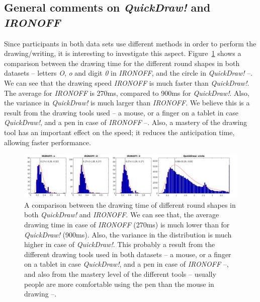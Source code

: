 
\subsection{General comments on \textit{QuickDraw!} and \textit{IRONOFF}}
\par Since participants in both data sets use different methods in order to perform the drawing/writing, it is interesting to investigate this aspect. Figure~\ref{fig:ironoff_quickdraw_connection} shows a comparison between the drawing time for the different round shapes in both datasets -- letters \textit{O}, \textit{o} and digit \textit{0} in \textit{IRONOFF}, and the circle in \textit{QuickDraw!} --. We can see that the drawing speed \textit{IRONOFF} is much faster than \textit{QuickDraw!}. The average for \textit{IRONOFF} is 270ms, compared to 900ms for \textit{QuickDraw!}. Also, the variance in \textit{QuickDraw!} is much larger than \textit{IRONOFF}. We believe this is a result from the drawing tools used -- a mouse, or a finger on a tablet in case \textit{QuickDraw!}, and a pen in case of \textit{IRONOFF} --. Also, a mastery of the drawing tool has an important effect on the speed; it reduces the anticipation time, allowing faster performance.

\begin{figure}
    \centering
    \includegraphics[scale=0.6]{images/dataset/cmp_rond.png}
    \caption{A comparison between the drawing time of different round shapes in both \textit{QuickDraw!} and \textit{IRONOFF}. We can see that, the average drawing time in case of \textit{IRONOFF} (270ms) is much lower than for \textit{QuickDraw!} (900ms). Also, the variance in the distribution is much higher in case of \textit{QuickDraw!}. This probably a result from the different drawing tools used in both datasets -- a mouse, or a finger on a tablet in case \textit{QuickDraw!}, and a pen in case of \textit{IRONOFF} --, and also from the mastery level of the different tools -- usually people are more comfortable using the pen than the mouse in drawing --.}
    \label{fig:ironoff_quickdraw_connection}
\end{figure}

